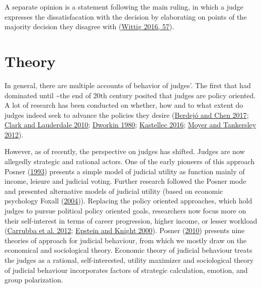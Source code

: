 \documentclass[
  11pt,
]{article}
\begin{document}
A separate opinion is a statement following the main ruling, in which a
judge expresses the dissatisfacation with the decision by elaborating on
points of the majority decision they disagree with
(\protect\hyperlink{ref-wittigOccurrenceSeparateOpinions2016}{Wittig
2016, 57}).

\hypertarget{theory}{%
\section{Theory}\label{theory}}

In general, there are multiple accounts of behavior of judges'. The
first that had dominated until \textasciitilde the end of 20th century
posited that judges are policy oriented. A lot of research has been
conducted on whether, how and to what extent do judges indeed seek to
advance the policies they desire
(\protect\hyperlink{ref-berdejoElectoralCyclesUS2017}{Berdejó and Chen
2017}; \protect\hyperlink{ref-clarkLocatingSupremeCourt2010}{Clark and
Lauderdale 2010};
\protect\hyperlink{ref-dworkinPoliticalJudgesRule1980}{Dworkin 1980};
\protect\hyperlink{ref-kastellecEmpiricallyEvaluatingCountermajoritarian2016}{Kastellec
2016}; \protect\hyperlink{ref-moyerJudicialInnovationSexual2012}{Moyer
and Tankersley 2012}).

However, as of recently, the perspective on judges has shifted. Judges
are now allegedly strategic and rational actors. One of the early
pioneers of this approach Posner
(\protect\hyperlink{ref-posnerWhatJudgesJustices1993}{1993}) presents a
simple model of judicial utility as function mainly of income, leisure
and judicial voting. Further research followed the Posner mode and
presented alternative models of judicial utility (based on economic
psychology Foxall
(\protect\hyperlink{ref-foxallWhatJudgesMaximize2004}{2004})). Replacing
the policy oriented approaches, which hold judges to pursue political
policy oriented goals, researchers now focus more on their self-interest
in terms of career progression, higher income, or lesser workload
(\protect\hyperlink{ref-carrubbaWhoControlsContent2012}{Carrubba et al.
2012};
\protect\hyperlink{ref-epsteinStrategicRevolutionJudicial2000}{Epstein
and Knight 2000}). Posner
(\protect\hyperlink{ref-posnerHowJudgesThink2010}{2010}) presents nine
theories of approach for judicial behaviour, from which we mostly draw
on the economical and sociological theory. Economic theory of judicial
behaviour treats the judges as a rational, self-interested, utility
maximizer and sociological theory of judicial behaviour incorporates
factors of strategic calculation, emotion, and group polarization.
\end{document}

